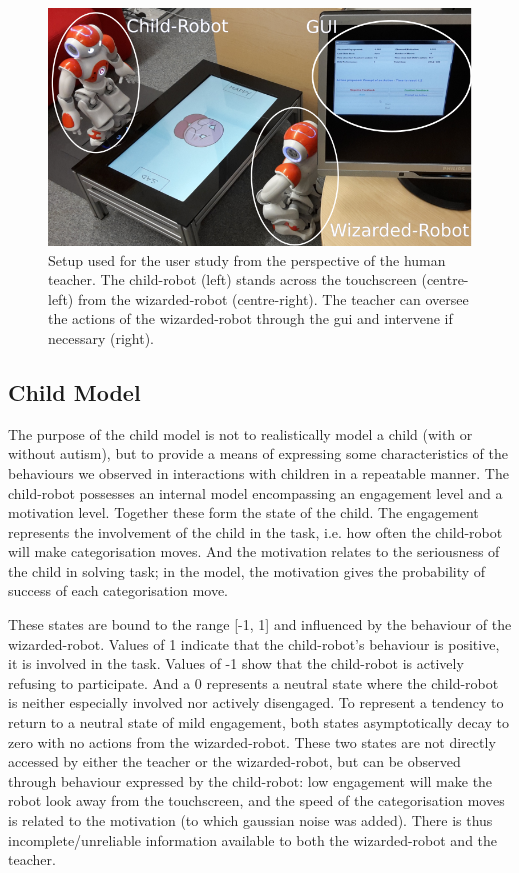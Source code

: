 \begin{figure}[ht]
	\centering
	\includegraphics[width=.9\textwidth]{setup_annotated.png}
	\caption{Setup used for the user study from the perspective of the human teacher. The child-robot (left) stands across the touchscreen (centre-left) from the wizarded-robot (centre-right). The teacher can oversee the actions of the wizarded-robot through the \gls{gui} and intervene if necessary (right).}
	\label{fig:woz_setup}
\end{figure}
		
\subsection{Child Model} \label{ssec:woz_child}

The purpose of the child model is not to realistically model a child (with or without autism), but to provide a means of expressing some characteristics of the behaviours we observed in interactions with children in a repeatable manner. The child-robot possesses an internal model encompassing an engagement level and a motivation level. Together these form the state of the child. The engagement represents the involvement of the child in the task, i.e. how often the child-robot will make categorisation moves. And the motivation relates to the seriousness of the child in solving task; in the model, the motivation gives the probability of success of each categorisation move. 

These states are bound to the range [-1, 1] and influenced by the behaviour of the wizarded-robot. Values of 1 indicate that the child-robot's behaviour is positive, it is involved in the task. Values of -1 show that the child-robot is actively refusing to participate. And a 0 represents a neutral state where the child-robot is neither especially involved nor actively disengaged. To represent a tendency to return to a neutral state of mild engagement, both states asymptotically decay to zero with no actions from the wizarded-robot. These two states are not directly accessed by either the teacher or the wizarded-robot, but can be observed through behaviour expressed by the child-robot: low engagement will make the robot look away from the touchscreen, and the speed of the categorisation moves is related to the motivation (to which gaussian noise was added). There is thus incomplete/unreliable information available to both the wizarded-robot and the teacher.

